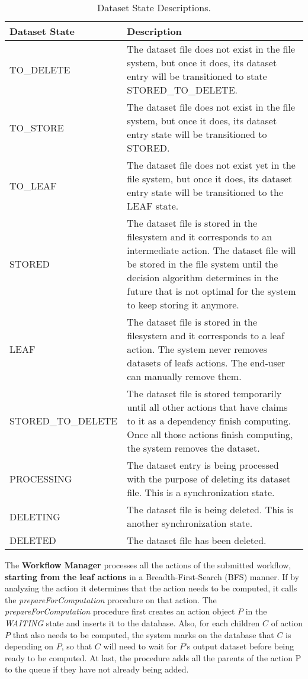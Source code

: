 \begin{table}
\begin{tabular}{| l | p{12cm} |}
\hline
\textbf{Dataset State} & \textbf{Description} \\ \hline
TO\_DELETE & The dataset file does not exist in the file system, but once it does, its dataset entry will be transitioned to state STORED\_TO\_DELETE. \\ \hline
TO\_STORE & The dataset file does not exist in the file system, but once it does, its dataset entry state will be transitioned to STORED. \\ \hline
TO\_LEAF & The dataset file does not exist yet in the file system, but once it does, its dataset entry state will be transitioned to the LEAF state. \\ \hline
STORED & The dataset file is stored in the filesystem and it corresponds to an intermediate action. The dataset file will be stored in the file system until the decision algorithm determines in the future that is not optimal for the system to keep storing it anymore. \\ \hline
LEAF & The dataset file is stored in the filesystem and it corresponds to a leaf action. The system never removes datasets of leafs actions. The end-user can manually remove them.\\ \hline
STORED\_TO\_DELETE & The dataset file is stored temporarily until all other actions that have claims to it as a dependency finish computing. Once all those actions finish computing, the system removes the dataset.  \\ \hline
PROCESSING & The dataset entry is being processed with the purpose of deleting its dataset file. This is a synchronization state. \\ \hline
DELETING & The dataset file is being deleted. This is another synchronization state. \\ \hline
DELETED & The dataset file has been deleted. \\ \hline
\end{tabular}
\caption{Dataset State Descriptions.\label{tab:dataset_states}}
\end{table}

The \textbf{Workflow Manager} processes all the actions of the submitted workflow, \textbf{starting from the leaf actions} in a Breadth-First-Search (BFS) manner. If by analyzing the action it determines that the action needs to be computed, it calls the \textit{prepareForComputation} procedure on that action.  The \textit{prepareForComputation} procedure first creates an action object $P$ in the \textit{WAITING} state and inserts it to the database. Also, for each children $C$ of action $P$ that also needs to be computed, the system marks on the database that $C$ is depending on $P$, so that $C$ will need to wait for $P$'s output dataset before being ready to be computed. At last, the procedure adds all the parents of the action P to the queue if they have not already being added.

